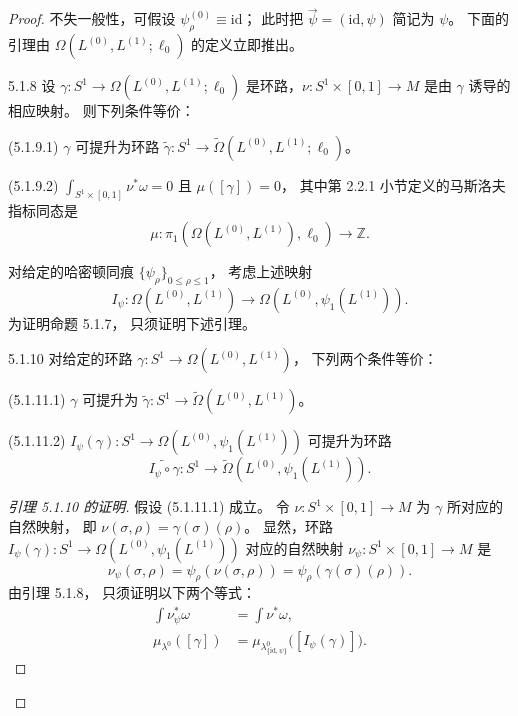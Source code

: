\begin{proof}
不失一般性，可假设
$\psi_\rho^{(0)}\equiv\mathrm{id}$；
此时把 $\vec\psi=(\mathrm{id},\psi)$
简记为 $\psi$。
下面的引理由
$\Omega(L^{(0)},L^{(1)};\ell_0)$
的定义立即推出。

\begin{lemma}{5.1.8}\label{lem:5-1-8}
设
$\gamma:S^1\to
\Omega(L^{(0)},L^{(1)};\ell_0)$
是环路，$\nu:S^1\times[0,1]\to M$
是由 $\gamma$ 诱导的相应映射。
则下列条件等价：
\par\noindent\textup{(5.1.9.1)}\quad
$\gamma$ 可提升为环路
$\widetilde\gamma:S^1\to
\widetilde\Omega(L^{(0)},L^{(1)};\ell_0)$。
\par\noindent\textup{(5.1.9.2)}\quad
$\displaystyle\int_{S^1\times[0,1]}\nu^*\omega=0$
且 $\mu([\gamma])=0$，
其中第 2.2.1 小节定义的马斯洛夫指标同态是
\[
\mu:\pi_1(\Omega(L^{(0)},L^{(1)}),\ell_0)
\longrightarrow\mathbb Z.
\]
\end{lemma}

对给定的哈密顿同痕
$\{\psi_\rho\}_{0\leq\rho\leq1}$，
考虑上述映射
\[
I_\psi:
\Omega(L^{(0)},L^{(1)})
\longrightarrow
\Omega(L^{(0)},\psi_1(L^{(1)})).
\]
为证明命题 5.1.7，
只须证明下述引理。

\begin{lemma}{5.1.10}\label{lem:5-1-10}
对给定的环路
$\gamma:S^1\to\Omega(L^{(0)},L^{(1)})$，
下列两个条件等价：
\par\noindent\textup{(5.1.11.1)}\quad
$\gamma$ 可提升为
$\widetilde\gamma:S^1\to
\widetilde\Omega(L^{(0)},L^{(1)})$。
\par\noindent\textup{(5.1.11.2)}\quad
$I_\psi(\gamma):
S^1\to\Omega(L^{(0)},\psi_1(L^{(1)}))$
可提升为环路
\[
\widetilde{I_\psi\circ\gamma}:
S^1\to
\widetilde\Omega(L^{(0)},\psi_1(L^{(1)})).
\]
\end{lemma}

\begin{proof}[引理 5.1.10 的证明]
假设 (5.1.11.1) 成立。
令 $\nu:S^1\times[0,1]\to M$
为 $\gamma$ 所对应的自然映射，
即 $\nu(\sigma,\rho)=\gamma(\sigma)(\rho)$。
显然，环路
$I_\psi(\gamma):
S^1\to\Omega(L^{(0)},\psi_1(L^{(1)}))$
对应的自然映射
$\nu_\psi:S^1\times[0,1]\to M$ 是
\begin{equation}
\nu_\psi(\sigma,\rho)
=\psi_\rho(\nu(\sigma,\rho))
=\psi_\rho(\gamma(\sigma)(\rho)).
\tag{5.1.12}\label{eq:5-1-12}
\end{equation}
由引理 5.1.8，
只须证明以下两个等式：
\begin{align}
\int\nu_\psi^*\omega
&=\int\nu^*\omega,
\tag{5.1.13.1}\label{eq:5-1-13-1}\\
\mu_{\lambda^0}([\gamma])
&=
\mu_{\lambda^0_{\{\mathrm{id},\psi\}}}
\bigl([I_\psi(\gamma)]\bigr).
\tag{5.1.13.2}\label{eq:5-1-13-2}
\end{align}


\end{proof}
\end{proof}
